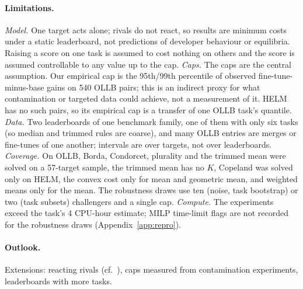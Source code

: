 \paragraph{Limitations.}
\emph{Model.} One target acts alone; rivals do not react, so results are minimum costs under a static leaderboard, not predictions of developer behaviour or equilibria. Raising a score on one task is assumed to cost nothing on others and the score is assumed controllable to any value up to the cap.
\emph{Caps.} The caps are the central assumption. Our empirical cap is the 95th/99th percentile of observed fine-tune-minus-base gains on 540 OLLB pairs; this is an indirect proxy for what contamination or targeted data could achieve, not a measurement of it. HELM has no such pairs, so its empirical cap is a transfer of one OLLB task's quantile.
\emph{Data.} Two leaderboards of one benchmark family, one of them with only six tasks (so median and trimmed rules are coarse), and many OLLB entries are merges or fine-tunes of one another; intervals are over targets, not over leaderboards.
\emph{Coverage.} On OLLB, Borda, Condorcet, plurality and the trimmed mean were solved on a 57-target sample, the trimmed mean has no $K$, Copeland was solved only on HELM, the convex cost only for mean and geometric mean, and weighted means only for the mean. The robustness draws use ten (noise, task bootstrap) or two (task subsets) challengers and a single cap.
\emph{Compute.} The experiments exceed the task's 4 CPU-hour estimate; MILP time-limit flags are not recorded for the robustness draws (Appendix~\ref{app:repro}).

\paragraph{Outlook.}
Extensions: reacting rivals (cf.\ \citealt{chen2026leaderboard}), caps measured from contamination experiments, leaderboards with more tasks.
